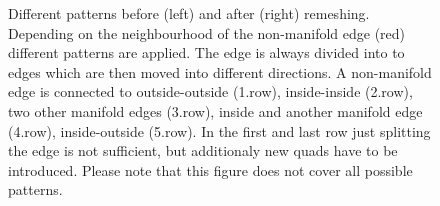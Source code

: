 \begin{figure}
\begin{center}
\begin{subfigure}[b]{.45\textwidth}
\end{subfigure}
\end{center}
\caption{Different patterns before (left) and after (right) remeshing. Depending on the neighbourhood of the non-manifold edge (red) different patterns are applied. The edge is always divided into to edges which are then moved into different directions. A non-manifold edge is connected to outside-outside (1.row), inside-inside (2.row), two other manifold edges (3.row), inside and another manifold edge (4.row), inside-outside (5.row). In the first and last row just splitting the edge is not sufficient, but additionaly new \acp{quad} have to be introduced. Please note that this figure does not cover all possible patterns.}
\label{fig:manifoldPatterns3D}
\end{figure}







